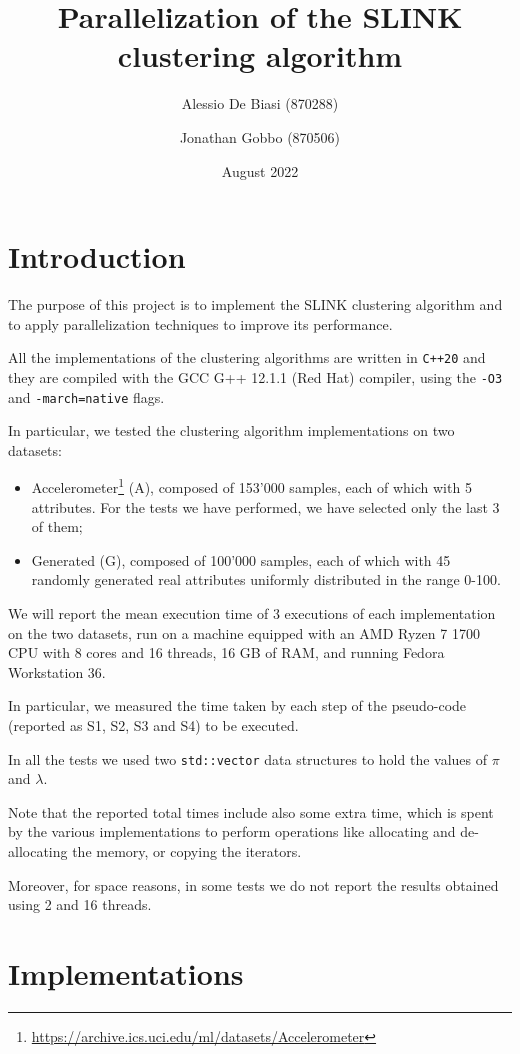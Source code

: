 \documentclass{article}
\title{Parallelization of the SLINK clustering algorithm\vspace{-1.25ex}}
\author{Alessio De Biasi (870288) \and Jonathan Gobbo (870506)}
\date{August 2022}
\begin{document}
\twocolumn
\maketitle

\section{Introduction}

The purpose of this project is to implement the SLINK clustering algorithm and to apply
parallelization techniques to improve its performance.

All the implementations of the clustering algorithms are written in \texttt{C++20} and they are
compiled with the GCC G++ 12.1.1 (Red Hat) compiler, using the \texttt{-O3} and
\texttt{-march=native} flags.

In particular, we tested the clustering algorithm implementations on two datasets:
\begin{itemize}
\item Accelerometer\footnote{\url{https://archive.ics.uci.edu/ml/datasets/Accelerometer}} (A),
composed
of 153'000 samples, each of which with 5 attributes. For the tests we have performed, we have
selected only the last 3 of them;
\item Generated (G), composed of 100'000 samples, each of which with 45 randomly generated real
attributes uniformly distributed in the range 0-100.
\end{itemize}

We will report the mean execution time of 3 executions of each implementation on the two datasets,
run on a machine equipped with an AMD Ryzen 7 1700 CPU with 8 cores and 16 threads, 16 GB of RAM,
and running Fedora Workstation 36.

In particular, we measured the time taken by each step of the pseudo-code (reported as S1, S2, S3
and S4) to be executed.

In all the tests we used two \texttt{std::vector} data structures to hold the values of $\pi$ and
$\lambda$.

Note that the reported total times include also some extra time, which is spent by the various
implementations to perform operations like allocating and de-allocating the memory, or copying
the iterators.

Moreover, for space reasons, in some tests we do not report the results obtained using 2 and 16
threads.

\hypertarget{implementations}{
\section{Implementations}
\label{implementations}}
\end{document}
